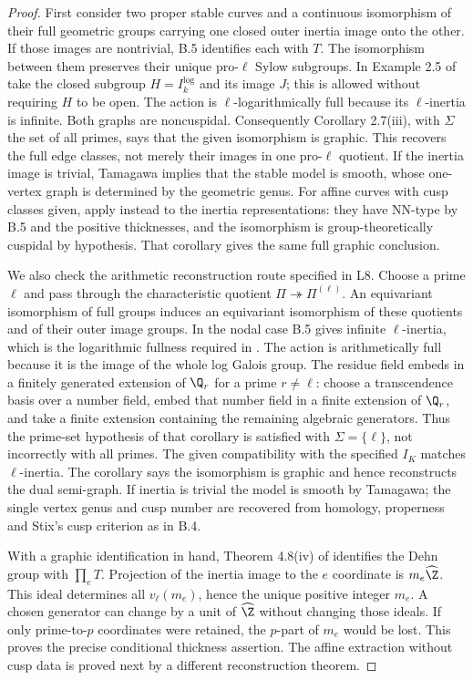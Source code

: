 \begin{proof}
First consider two proper stable curves and a continuous isomorphism of
their full geometric groups carrying one closed outer inertia image onto
the other. If those images are nontrivial, B.5 identifies each with $T$.
The isomorphism between them preserves their unique pro-$\ell$ Sylow
subgroups. In Example 2.5 of \citet{BC_MochComb} take the closed subgroup
$H=I_k^{\log}$ and its image $J$; this is allowed without requiring $H$
to be open. The action is $\ell$-logarithmically full because its
$\ell$-inertia is infinite. Both graphs are noncuspidal. Consequently
Corollary 2.7(iii), with $\Sigma$ the set of all primes, says that the
given isomorphism is graphic. This recovers the full edge classes, not
merely their images in one pro-$\ell$ quotient. If the inertia image is
trivial, Tamagawa implies that the stable model is smooth, whose one-vertex
graph is determined by the geometric genus. For affine curves with cusp
classes given, apply instead \citet[Corollary 4.2]{BC_HMNodes} to the
inertia representations: they have NN-type by B.5 and the positive
thicknesses, and the isomorphism is group-theoretically cuspidal by
hypothesis. That corollary gives the same full graphic conclusion.

We also check the arithmetic reconstruction route specified in L8.
Choose a prime $\ell$ and pass through the characteristic quotient
$\Pi\twoheadrightarrow\Pi^{(\ell)}$. An equivariant isomorphism of full
groups induces an equivariant isomorphism of these quotients and of their
outer image groups. In the nodal case B.5 gives infinite $\ell$-inertia,
which is the logarithmic fullness required in
\citet[Corollary 2.8]{BC_MochComb}. The action is arithmetically full because
it is the image of the whole log Galois group. The residue field embeds in
a finitely generated extension of $\Q_r$ for a prime $r\ne\ell$: choose a
transcendence basis over a number field, embed that number field in a finite
extension of $\Q_r$, and take a finite extension containing the remaining
algebraic generators. Thus the prime-set hypothesis of that corollary is
satisfied with $\Sigma=\{\ell\}$, not incorrectly with all primes.
The given compatibility with the specified $I_K$ matches $\ell$-inertia.
The corollary says the isomorphism is graphic and hence reconstructs the
dual semi-graph. If inertia is trivial the model is smooth by Tamagawa;
the single vertex genus and cusp number are recovered from homology,
properness and Stix's cusp criterion as in B.4.

With a graphic identification in hand, Theorem 4.8(iv) of
\citet{BC_HMTopics} identifies the Dehn group with $\prod_eT$.
Projection of the inertia image to the $e$ coordinate is $m_e\widehat\Z$.
This ideal determines all $v_\ell(m_e)$, hence the unique positive integer
$m_e$. A chosen generator can change by a unit of $\widehat\Z$ without
changing those ideals. If only prime-to-$p$ coordinates were retained,
the $p$-part of $m_e$ would be lost. This proves the precise conditional
thickness assertion. The affine extraction without cusp data is proved
next by a different reconstruction theorem.
\end{proof}

